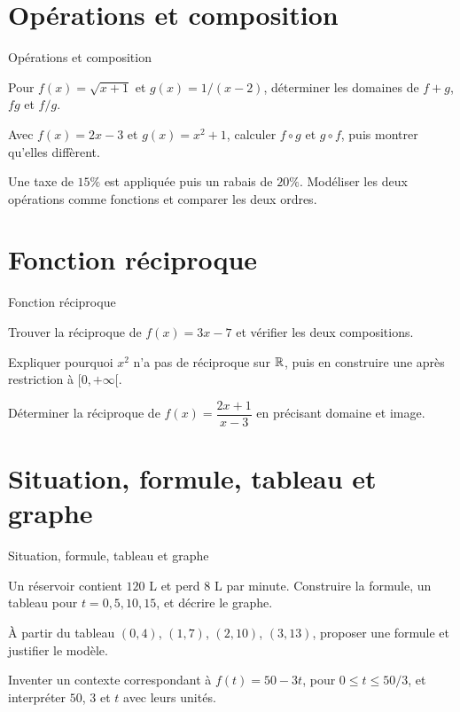 \section{Opérations et composition}
\label{workbook:section:03.04}
\begin{exerciseblock}{Opérations et composition}
\item Pour $f(x)=\sqrt{x+1}$ et $g(x)=1/(x-2)$, déterminer les domaines de $f+g$, $fg$ et $f/g$.
\item Avec $f(x)=2x-3$ et $g(x)=x^2+1$, calculer $f\circ g$ et $g\circ f$, puis montrer qu'elles diffèrent.
\item Une taxe de $15\%$ est appliquée puis un rabais de $20\%$. Modéliser les deux opérations comme fonctions et comparer les deux ordres.
\end{exerciseblock}
\section{Fonction réciproque}
\label{workbook:section:03.05}
\begin{exerciseblock}{Fonction réciproque}
\item Trouver la réciproque de $f(x)=3x-7$ et vérifier les deux compositions.
\item Expliquer pourquoi $x^2$ n'a pas de réciproque sur $\mathbb{R}$, puis en construire une après restriction à $[0,+\infty[$.
\item Déterminer la réciproque de $f(x)=\dfrac{2x+1}{x-3}$ en précisant domaine et image.
\end{exerciseblock}
\section{Situation, formule, tableau et graphe}
\label{workbook:section:03.06}
\begin{exerciseblock}{Situation, formule, tableau et graphe}
\item Un réservoir contient $120$ L et perd $8$ L par minute. Construire la formule, un tableau pour $t=0,5,10,15$, et décrire le graphe.
\item À partir du tableau $(0,4)$, $(1,7)$, $(2,10)$, $(3,13)$, proposer une formule et justifier le modèle.
\item Inventer un contexte correspondant à \(f(t)=50-3t\), pour \(0\le t\le50/3\), et interpréter \(50\), \(3\) et \(t\) avec leurs unités.
\end{exerciseblock}

